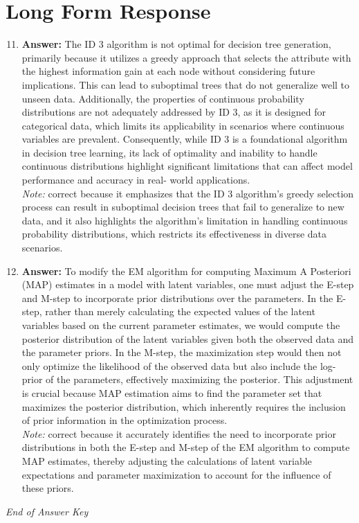 \documentclass[12pt]{article}
\begin{document}
\section*{Long Form Response}
\begin{enumerate}[label=\arabic*.]
\setcounter{enumi}{10}
\item \textbf{Answer:} The ID 3 algorithm is not optimal for decision tree generation, primarily because it utilizes a greedy approach that selects the attribute with the highest information gain at each node without considering future implications. This can lead to suboptimal trees that do not generalize well to unseen data. Additionally, the properties of continuous probability distributions are not adequately addressed by ID 3, as it is designed for categorical data, which limits its applicability in scenarios where continuous variables are prevalent. Consequently, while ID 3 is a foundational algorithm in decision tree learning, its lack of optimality and inability to handle continuous distributions highlight significant limitations that can affect model performance and accuracy in real- world applications.
\\ \textit{Note:} correct because it emphasizes that the ID 3 algorithm's greedy selection process can result in suboptimal decision trees that fail to generalize to new data, and it also highlights the algorithm's limitation in handling continuous probability distributions, which restricts its effectiveness in diverse data scenarios.
\item \textbf{Answer:} To modify the EM algorithm for computing Maximum A Posteriori (MAP) estimates in a model with latent variables, one must adjust the E-step and M-step to incorporate prior distributions over the parameters. In the E-step, rather than merely calculating the expected values of the latent variables based on the current parameter estimates, we would compute the posterior distribution of the latent variables given both the observed data and the parameter priors. In the M-step, the maximization step would then not only optimize the likelihood of the observed data but also include the log-prior of the parameters, effectively maximizing the posterior. This adjustment is crucial because MAP estimation aims to find the parameter set that maximizes the posterior distribution, which inherently requires the inclusion of prior information in the optimization process.
\\ \textit{Note:} correct because it accurately identifies the need to incorporate prior distributions in both the E-step and M-step of the EM algorithm to compute MAP estimates, thereby adjusting the calculations of latent variable expectations and parameter maximization to account for the influence of these priors.
\end{enumerate}

\vfill
\noindent\textit{End of Answer Key}
\end{document}

